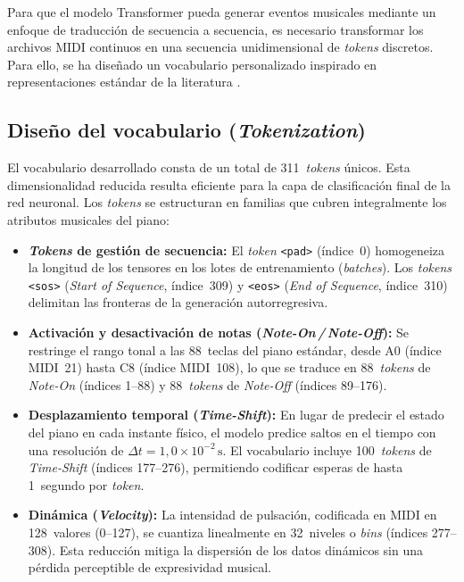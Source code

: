 Para que el modelo Transformer pueda generar eventos musicales mediante
un enfoque de traducción de secuencia a secuencia, es necesario
transformar los archivos MIDI continuos en una secuencia unidimensional
de \textit{tokens} discretos. Para ello, se ha diseñado un vocabulario
personalizado inspirado en representaciones estándar de la literatura
\cite{oore2020time}.

\subsection{Diseño del vocabulario (\textit{Tokenization})}

El vocabulario desarrollado consta de un total de 311~\textit{tokens}
únicos. Esta dimensionalidad reducida resulta eficiente para la capa de
clasificación final de la red neuronal. Los \textit{tokens} se
estructuran en familias que cubren integralmente los atributos musicales
del piano:

\begin{itemize}
    \item \textbf{\textit{Tokens} de gestión de secuencia:} El
    \textit{token} \texttt{<pad>} (índice~0) homogeneiza la longitud de
    los tensores en los lotes de entrenamiento (\textit{batches}). Los
    \textit{tokens} \texttt{<sos>} (\textit{Start of Sequence},
    índice~309) y \texttt{<eos>} (\textit{End of Sequence}, índice~310)
    delimitan las fronteras de la generación autorregresiva.

    \item \textbf{Activación y desactivación de notas
    (\textit{Note-On\,/\,Note-Off}):} Se restringe el rango tonal a las
    88~teclas del piano estándar, desde A0 (índice MIDI~21) hasta C8
    (índice MIDI~108), lo que se traduce en 88~\textit{tokens} de
    \textit{Note-On} (índices 1--88) y 88~\textit{tokens} de
    \textit{Note-Off} (índices 89--176).

    \item \textbf{Desplazamiento temporal (\textit{Time-Shift}):} En
    lugar de predecir el estado del piano en cada instante físico, el
    modelo predice saltos en el tiempo con una resolución de
    $\Delta t = 1{,}0 \times 10^{-2}\,\mathrm{s}$. El vocabulario
    incluye 100~\textit{tokens} de \textit{Time-Shift} (índices
    177--276), permitiendo codificar esperas de hasta 1~segundo por
    \textit{token}.

    \item \textbf{Dinámica (\textit{Velocity}):} La intensidad de
    pulsación, codificada en MIDI en 128~valores (0--127), se cuantiza
    linealmente en 32~niveles o \textit{bins} (índices 277--308). Esta
    reducción mitiga la dispersión de los datos dinámicos sin una pérdida
    perceptible de expresividad musical.
\end{itemize}

